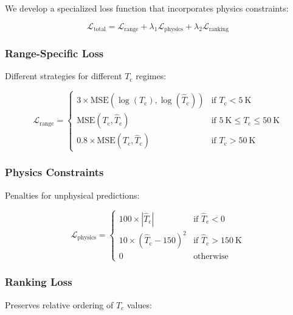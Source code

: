 \documentclass[11pt,a4paper]{article}
\begin{document}
We develop a specialized loss function that incorporates physics constraints:

\begin{equation}
\mathcal{L}_{\text{total}} = \mathcal{L}_{\text{range}} + \lambda_1 \mathcal{L}_{\text{physics}} + \lambda_2 \mathcal{L}_{\text{ranking}}
\end{equation}

\subsubsection{Range-Specific Loss}

Different strategies for different $T_{\text{c}}$ regimes:

\begin{equation}
\mathcal{L}_{\text{range}} = \begin{cases}
3 \times \text{MSE}(\log(T_{\text{c}}), \log(\hat{T}_{\text{c}})) & \text{if } T_{\text{c}} < \SI{5}{\kelvin} \\
\text{MSE}(T_{\text{c}}, \hat{T}_{\text{c}}) & \text{if } \SI{5}{\kelvin} \leq T_{\text{c}} \leq \SI{50}{\kelvin} \\
0.8 \times \text{MSE}(T_{\text{c}}, \hat{T}_{\text{c}}) & \text{if } T_{\text{c}} > \SI{50}{\kelvin}
\end{cases}
\end{equation}

\subsubsection{Physics Constraints}

Penalties for unphysical predictions:

\begin{equation}
\mathcal{L}_{\text{physics}} = \begin{cases}
100 \times |\hat{T}_{\text{c}}| & \text{if } \hat{T}_{\text{c}} < 0 \\
10 \times (\hat{T}_{\text{c}} - 150)^2 & \text{if } \hat{T}_{\text{c}} > \SI{150}{\kelvin} \\
0 & \text{otherwise}
\end{cases}
\end{equation}

\subsubsection{Ranking Loss}

Preserves relative ordering of $T_{\text{c}}$ values:
\end{document}
